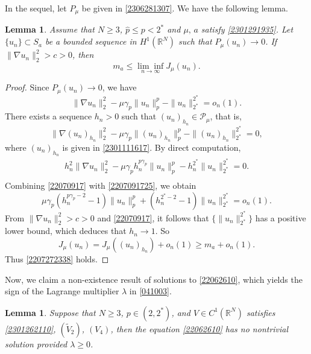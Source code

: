 \documentclass[10pt]{article}
\numberwithin{equation}{section}
\newtheorem{lemma}[theorem]{Lemma}
\numberwithin{equation}{section}
\begin{document}
In the sequel, let $P_\mu$ be given in \eqref{2306281307}.
We have the following lemma.
\begin{lemma}\label{22070919}
Assume that $N\ge 3$, $\hat{p}\le p<2^*$ and $\mu,\, a$ satisfy \eqref{2301291935}. Let $\{u_n\}\subset S_{a}$ be a bounded sequence in $H^1(\mathbb{R}^N)$ such that $P_{\mu}(u_n)\rightarrow 0$. If $\|\nabla u_n\|_2^2>c > 0$, then
\begin{equation}\label{2207272338}
m_a\le \underset{n\rightarrow \infty}{\lim\inf}J_{\mu}(u_n).
\end{equation}
\end{lemma}
\begin{proof}
Since $P_{\mu}(u_n)\rightarrow 0$, we have \begin{equation}\label{22070917}
\|\nabla u_n\|_2^2-\mu\gamma_p\|u_n\|_p^p-\|u_n\|_{2^*}^{2^*}=o_n(1).
\end{equation}
There exists a sequence $h_n>0$ such that $(u_n)_{h_n}\in \mathcal{P}_{\mu}$, that is,
\[
\|\nabla (u_n)_{h_n}\|_2^2-\mu\gamma_p\|(u_n)_{h_n}\|_p^p-\|(u_n)_{h_n}\|_{2^*}^{2^*}=0,
\]
where $(u_n)_{h_n}$ is given in \eqref{2301111617}. By direct computation,
\begin{equation}\label{2207091725}
\begin{aligned}
h_n^2\|\nabla u_n\|_2^2-\mu\gamma_p  h_n^{p\gamma_p}\|u_n\|_p^p-h_n^{2^*}\|u_n\|_{2^*}^{2^*}=0.\\
\end{aligned}
\end{equation}
Combining \eqref{22070917} with \eqref{2207091725}, we obtain
\[
\mu\gamma_p ( h_n^{p\gamma_p-2}-1)\|u_n\|_p^p+(h_n^{2^*-2}-1)\|u_n\|_{2^*}^{2^*}=o_n(1).
\]
From $\|\nabla u_n\|_2^2>c > 0$ and \eqref{22070917}, it follows that $\{\|u_n\|_{2^*}^{2^*}\}$ has a positive lower bound, which deduces that $h_n\rightarrow 1$. So
\[
J_{\mu}(u_n)=J_{\mu}((u_n)_{h_n})+o_n(1)\ge m_a + o_n(1).
\]
Thus \eqref{2207272338} holds.
\end{proof}
Now, we claim a non-existence result of solutions to \eqref{22062610}, which yields the sign of the Lagrange multiplier $\lambda$ in \eqref{041003}.
\begin{lemma}\label{22062613}
Suppose that $N\ge 3$, $p\in (2, 2^*)$, and $V\in C^1(\mathbb{R}^N)$ satisfies \eqref{2301262110}, $(\widetilde{V}_2)$, $(V_4)$, then the equation \eqref{22062610}
has no nontrivial solution provided $\lambda\ge 0$.
\end{lemma}
\end{document}

